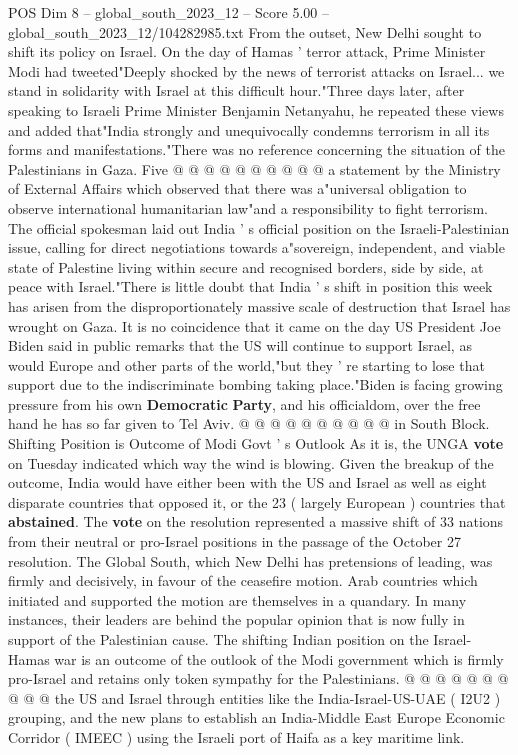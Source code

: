 \begin{textsample}{POS Dim 8 – global\_south\_2023\_12 – Score 5.00 – global\_south\_2023\_12/104282985.txt}
From the outset, New Delhi sought to shift its policy on Israel.
On the day of Hamas ' terror attack, Prime Minister Modi had tweeted"Deeply shocked by the news of terrorist attacks on Israel... we stand in solidarity with Israel at this difficult hour."Three days later, after speaking to Israeli Prime Minister Benjamin Netanyahu, he repeated these views and added that"India strongly and unequivocally condemns terrorism in all its forms and manifestations."There was no reference concerning the situation of the Palestinians in Gaza.
Five @ @ @ @ @ @ @ @ @ @ a statement by the Ministry of External Affairs which observed that there was a"universal obligation to observe international humanitarian law"and a responsibility to fight terrorism.
The official spokesman laid out India ' s official position on the Israeli-Palestinian issue, calling for direct negotiations towards a"sovereign, independent, and viable state of Palestine living within secure and recognised borders, side by side, at peace with Israel."There is little doubt that India ' s shift in position this week has arisen from the disproportionately massive scale of destruction that Israel has wrought on Gaza.
It is no coincidence that it came on the day US President Joe Biden said in public remarks that the US will continue to support Israel, as would Europe and other parts of the world,"but they ' re starting to lose that support due to the indiscriminate bombing taking place."Biden is facing growing pressure from his own \textbf{Democratic} \textbf{Party}, and his officialdom, over the free hand he has so far given to Tel Aviv. @ @ @ @ @ @ @ @ @ @ in South Block.
Shifting Position is Outcome of Modi Govt ' s Outlook As it is, the UNGA \textbf{vote} on Tuesday indicated which way the wind is blowing.
Given the breakup of the outcome, India would have either been with the US and Israel as well as eight disparate countries that opposed it, or the 23 ( largely European ) countries that \textbf{abstained}.
The \textbf{vote} on the resolution represented a massive shift of 33 nations from their neutral or pro-Israel positions in the passage of the October 27 resolution.
The Global South, which New Delhi has pretensions of leading, was firmly and decisively, in favour of the ceasefire motion.
Arab countries which initiated and supported the motion are themselves in a quandary.
In many instances, their leaders are behind the popular opinion that is now fully in support of the Palestinian cause.
The shifting Indian position on the Israel-Hamas war is an outcome of the outlook of the Modi government which is firmly pro-Israel and retains only token sympathy for the Palestinians. @ @ @ @ @ @ @ @ @ @ the US and Israel through entities like the India-Israel-US-UAE ( I2U2 ) grouping, and the new plans to establish an India-Middle East Europe Economic Corridor ( IMEEC ) using the Israeli port of Haifa as a key maritime link.

\end{textsample}

